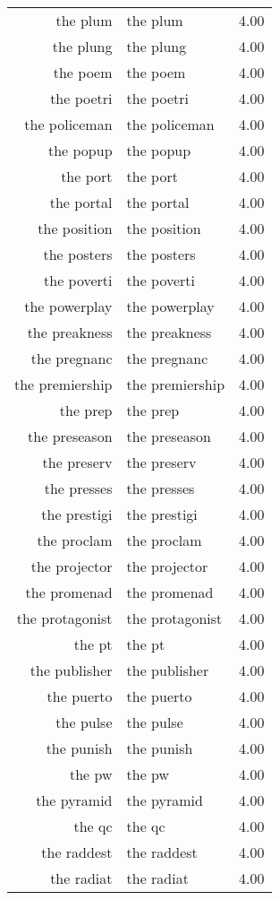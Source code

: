 \begin{table}[ht]
\begin{tabular}{rlr}
  the plum & the plum & 4.00 \\ 
  the plung & the plung & 4.00 \\ 
  the poem & the poem & 4.00 \\ 
  the poetri & the poetri & 4.00 \\ 
  the policeman & the policeman & 4.00 \\ 
  the popup & the popup & 4.00 \\ 
  the port & the port & 4.00 \\ 
  the portal & the portal & 4.00 \\ 
  the position & the position & 4.00 \\ 
  the posters & the posters & 4.00 \\ 
  the poverti & the poverti & 4.00 \\ 
  the powerplay & the powerplay & 4.00 \\ 
  the preakness & the preakness & 4.00 \\ 
  the pregnanc & the pregnanc & 4.00 \\ 
  the premiership & the premiership & 4.00 \\ 
  the prep & the prep & 4.00 \\ 
  the preseason & the preseason & 4.00 \\ 
  the preserv & the preserv & 4.00 \\ 
  the presses & the presses & 4.00 \\ 
  the prestigi & the prestigi & 4.00 \\ 
  the proclam & the proclam & 4.00 \\ 
  the projector & the projector & 4.00 \\ 
  the promenad & the promenad & 4.00 \\ 
  the protagonist & the protagonist & 4.00 \\ 
  the pt & the pt & 4.00 \\ 
  the publisher & the publisher & 4.00 \\ 
  the puerto & the puerto & 4.00 \\ 
  the pulse & the pulse & 4.00 \\ 
  the punish & the punish & 4.00 \\ 
  the pw & the pw & 4.00 \\ 
  the pyramid & the pyramid & 4.00 \\ 
  the qc & the qc & 4.00 \\ 
  the raddest & the raddest & 4.00 \\ 
  the radiat & the radiat & 4.00 \\ 

\end{tabular}
\end{table}
